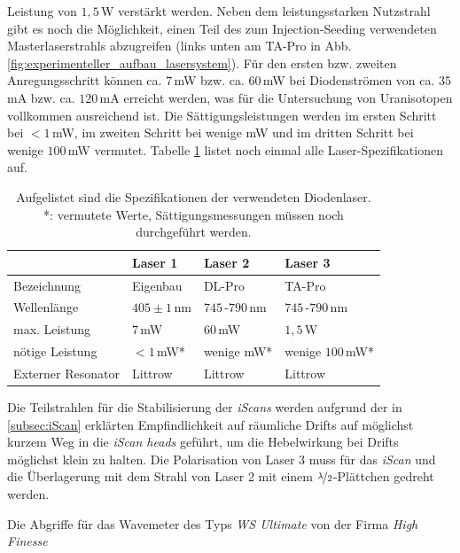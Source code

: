 Leistung von $1,5\,$W verstärkt werden. Neben dem leistungsstarken Nutzstrahl
gibt es noch die Möglichkeit, einen Teil des zum Injection-Seeding verwendeten
Masterlaserstrahls abzugreifen (links unten am TA-Pro in Abb.
\ref{fig:experimenteller_aufbau_lasersystem}). Für den ersten bzw.
zweiten Anregungsschritt können ca. $7\,$mW bzw. ca. $60\,$mW bei Diodenströmen von ca. $35\,$mA bzw. ca.
$120\,$mA erreicht werden, was für die Untersuchung von Uranisotopen vollkommen
ausreichend ist. Die Sättigungsleistungen werden im ersten Schritt bei $<1\,$mW,
im zweiten Schritt bei wenige mW und im dritten Schritt bei wenige $100\,$mW
vermutet.
Tabelle \ref{tab:laser_spezifikationen} listet noch einmal alle Laser-Spezifikationen auf.
\par
\begin{table}
	\begin{tabular}{p{}|p{}p{}p{}}
		\toprule
		& Laser 1 & Laser 2 & Laser 3\\
		\midrule[1px]
		\hline
		Bezeichnung & Eigenbau & DL-Pro & TA-Pro\\
		Wellenlänge & $405\pm1\,$nm & $745\,$-$790\,$nm & $745\,$-$790\,$nm\\
		max. Leistung & $7\,$mW & $60\,$mW & $1,5\,$W\\
		nötige Leistung & $<1\,$mW* & wenige mW* & wenige $100\,$mW*\\
		Externer Resonator & Littrow & Littrow & Littrow\\
		\bottomrule[1px]
	\end{tabular}
	\caption[Spezifikationen der verwendeten
	Diodenlaser]{Aufgelistet sind die Spezifikationen der verwendeten
	Diodenlaser.\\
	*: vermutete Werte, Sättigungsmessungen müssen noch durchgeführt werden.}
	\label{tab:laser_spezifikationen}
\end{table}
Die Teilstrahlen für die Stabilisierung der \textit{iScans} werden aufgrund der
in \ref{subsec:iScan} erklärten Empfindlichkeit auf räumliche Drifts auf
möglichst kurzem Weg in die \textit{iScan heads} geführt, um die Hebelwirkung
bei Drifts möglichst klein zu halten. Die Polarisation von Laser 3 muss für
das \textit{iScan} und die Überlagerung mit dem Strahl von Laser 2 mit einem
$\nicefrac{\lambda}{2}$-Plättchen gedreht werden.\par
Die Abgriffe für das Wavemeter des Typs \textit{WS Ultimate} von der Firma \textit{High Finesse}
